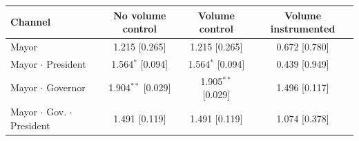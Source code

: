 \begin{tabular}{@{}lccc@{}}
\toprule
Channel & No volume control & Volume control & Volume instrumented \\
\midrule
Mayor & 1.215 [0.265] & 1.215 [0.265] & 0.672 [0.780] \\
Mayor $\cdot$ President & 1.564$^{*}$ [0.094] & 1.564$^{*}$ [0.094] & 0.439 [0.949] \\
Mayor $\cdot$ Governor & 1.904$^{**}$ [0.029] & 1.905$^{**}$ [0.029] & 1.496 [0.117] \\
Mayor $\cdot$ Gov. $\cdot$ President & 1.491 [0.119] & 1.491 [0.119] & 1.074 [0.378] \\
\bottomrule
\end{tabular}
